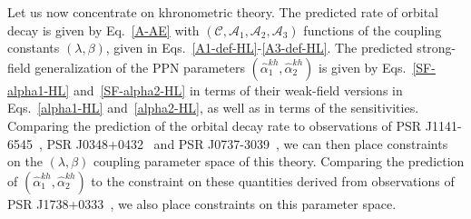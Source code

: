 \documentclass[prd,aps,twocolumn,nofootinbib,showpacs,superscriptaddress]{revtex4-1}
\def\kh{{kh}}
\begin{document}
Let us now concentrate on khronometric theory. The predicted rate of orbital decay is given by Eq.~\eqref{A-AE} with $(\mathcal{C}, \mathcal{A}_{1},\mathcal{A}_{2},\mathcal{A}_{3})$ functions of the coupling constants $(\lambda,\beta)$, given in Eqs.~\eqref{A1-def-HL}-\eqref{A3-def-HL}. The predicted strong-field generalization of the PPN parameters $(\hat{\alpha}_{1}^{\kh},\hat{\alpha}_{2}^{\kh})$ is given by Eqs.~\eqref{SF-alpha1-HL} and~\eqref{SF-alpha2-HL} in terms of their weak-field versions in Eqs.~\eqref{alpha1-HL} and~\eqref{alpha2-HL}, as well as in terms of the sensitivities. Comparing the prediction of the orbital decay rate to observations of PSR J1141-6545~\cite{bhat}, PSR J0348+0432~\cite{2.01NS} and PSR J0737-3039~\cite{kramer-double-pulsar}, we can then place constraints on the $(\lambda,\beta)$ coupling parameter space of this theory. Comparing the prediction of $(\hat{\alpha}_{1}^{\kh},\hat{\alpha}_{2}^{\kh})$ to the constraint on these quantities derived from observations of PSR 
J1738+0333~\cite{freire}, we also place constraints on this parameter space.
\end{document}
